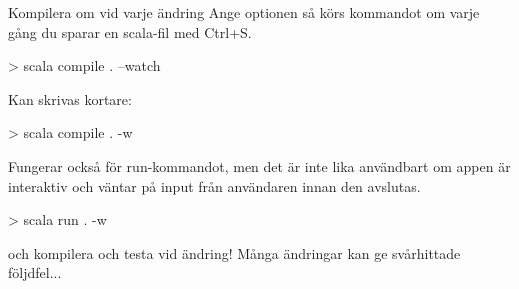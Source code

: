 \begin{Slide}{Kompilera om vid varje ändring}\SlideFontSmall
Ange optionen  så körs kommandot om varje gång du sparar en scala-fil med Ctrl+S.
\begin{REPLsmall}
> scala compile . --watch
\end{REPLsmall}
Kan skrivas kortare:
\begin{REPLsmall}
> scala compile . -w
\end{REPLsmall}
Fungerar också för run-kommandot, men det är inte lika användbart om appen är interaktiv och väntar på input från användaren innan den avslutas. 
\begin{REPLsmall}
> scala run . -w
\end{REPLsmall}
 och kompilera och testa vid  ändring! Många ändringar kan ge svårhittade följdfel...
    
  
\end{Slide}




